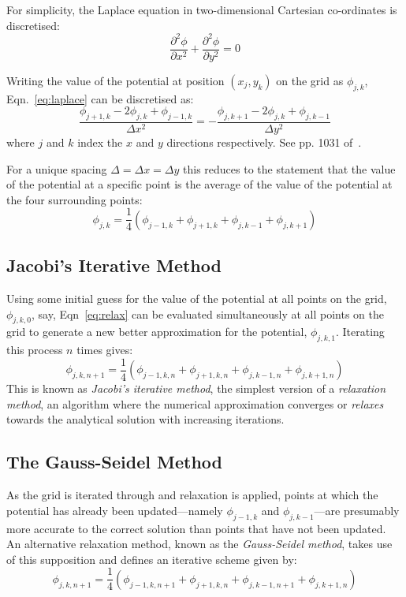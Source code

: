 \documentclass[11pt, a4paper]{article}
\newcommand{\be}{\begin{equation}}
\newcommand{\ee}{\end{equation}}
\begin{document}
For simplicity, the Laplace equation in two-dimensional Cartesian co-ordinates is
discretised:
% 
\be 
\frac{\partial^2 \phi}{\partial x^2}+\frac{\partial^2 \phi}{\partial y^2} = 0
\label{eq:laplace}
\ee 

Writing the value of the potential at position $(x_j,y_k)$ on the grid as $\phi_{j,k}$,
Eqn.~\ref{eq:laplace} can be discretised as:
% 
\be
\frac{\phi_{j+1,k}-2\phi_{j,k}+\phi_{j-1,k}}{\Delta x^2} = - \frac{\phi_{j,k+1}-2\phi_{j,k}+\phi_{j,k-1}}{\Delta y^2}
\ee
%
where $j$ and $k$ index the $x$ and $y$ directions respectively. See pp. 1031
of~\cite{mm}.

For a unique spacing $\Delta=\Delta x=\Delta y$ this reduces to the statement that
the value of the potential at a specific point is the average of the value of the
potential at the four surrounding points: 
%
\be
\phi_{j,k}= \frac{1}{4}(\phi_{j-1,k}+\phi_{j+1,k}+\phi_{j,k-1}+\phi_{j,k+1})
\label{eq:relax}
\ee

\subsection{Jacobi's Iterative Method}

Using some initial guess for the value of the potential at all points on the
grid, $\phi_{j,k,0}$, say, Eqn~\ref{eq:relax} can be evaluated simultaneously at all
points on the grid to generate a new better approximation for the potential,
$\phi_{j,k,1}$. Iterating this process $n$ times gives:
%
\be
\phi_{j,k,n+1}= \frac{1}{4}(\phi_{j-1,k,n}+\phi_{j+1,k,n}+\phi_{j,k-1,n}+\phi_{j,k+1,n})
\ee
%
This is known as \emph{Jacobi's iterative method}, the simplest version of a
\emph{relaxation method}, an algorithm where the numerical approximation converges or
\emph{relaxes} towards the analytical solution with increasing iterations. 

\subsection{The Gauss-Seidel Method}

As the grid is iterated through and relaxation is applied, points at which the potential
has already been updated---namely $\phi_{j-1,k}$ and $\phi_{j,k-1}$---are presumably
more accurate to the correct solution than points that have not been updated.
An alternative relaxation method, known as the \emph{Gauss-Seidel method}, takes use of
this supposition and defines an iterative scheme given by:
%
\be
\phi_{j,k,n+1}= \frac{1}{4}(\phi_{j-1,k,n+1}+\phi_{j+1,k,n}+\phi_{j,k-1,n+1}+\phi_{j,k+1,n})
\ee
\end{document}
